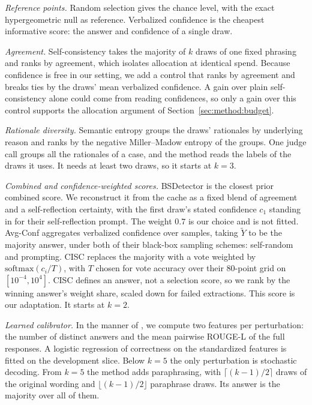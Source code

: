 \emph{Reference points.} Random selection gives the chance level, with the
exact hypergeometric null as reference. Verbalized confidence is the
cheapest informative score: the answer and confidence of a single draw.

\emph{Agreement.} Self-consistency \citep{wang2022} takes the majority of
$k$ draws of one fixed phrasing and ranks by agreement, which isolates
allocation at identical spend. Because confidence is free in our setting,
we add a control that ranks by agreement and breaks ties by the draws' mean
verbalized confidence. A gain over plain self-consistency alone could come
from reading confidences, so only a gain over this control supports the
allocation argument of Section~\ref{sec:method:budget}.

\emph{Rationale diversity.} Semantic entropy \citep{kuhn2023} groups the
draws' rationales by underlying reason and ranks by the negative
Miller--Madow entropy of the groups. One judge call groups all the
rationales of a case, and the method reads the labels of the draws it uses.
It needs at least two draws, so it starts at $k = 3$.

\emph{Combined and confidence-weighted scores.} BSDetector
\citep{chen2024} is the closest prior combined score. We reconstruct it
from the cache as a fixed blend of agreement and a self-reflection
certainty, with the first draw's stated confidence $c_1$ standing in for
their self-reflection prompt. The weight $0.7$ is our choice and is not fitted.
Avg-Conf \citep{xiong2023} aggregates verbalized confidence over samples,
taking $\tilde Y$ to be the majority answer, under both of their black-box
sampling schemes: self-random and prompting. CISC \citep{taubenfeld2025}
replaces the majority with a vote weighted by $\mathrm{softmax}(c_i/T)$,
with $T$ chosen for vote accuracy over their $80$-point grid on
$[10^{-4}, 10^{4}]$. CISC defines an answer, not a selection score, so we
rank by the winning answer's weight share, scaled down for failed
extractions. This score is our adaptation. It starts at $k = 2$.

\emph{Learned calibrator.} In the manner of \citet{pedapati2024}, we compute
two features per perturbation: the number of distinct answers and the mean
pairwise ROUGE-L of the full responses. A logistic regression of correctness
on the standardized features is fitted on the development slice. Below
$k = 5$ the only perturbation is stochastic decoding. From $k = 5$ the
method adds paraphrasing, with $\lceil (k-1)/2 \rceil$ draws of the original
wording and $\lfloor (k-1)/2 \rfloor$ paraphrase draws. Its answer is the
majority over all of them.

